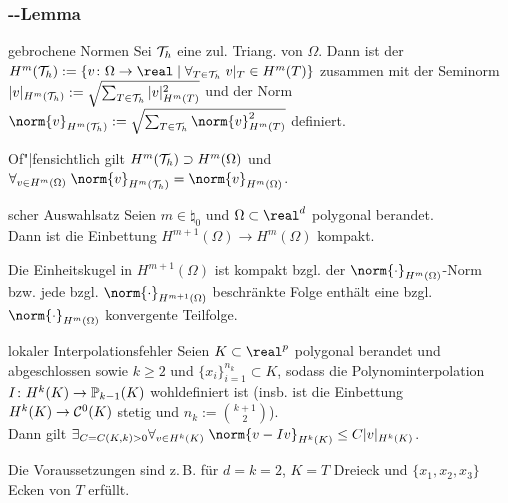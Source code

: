 \subsubsection{%
    --Lemma%
}

\begin{Def}{gebrochene Normen}
    Sei $\mathcal{T}_h$ eine zul. Triang. von $\Omega$.
    Dann ist der 
    $H^m(\T_h) := \{v\colon \Omega \to \real \;|\; \forall_{T \in \T_h}\; v|_T \in H^m(T)\}$
    zusammen mit der Seminorm\\
    $|v|_{H^m(\mathcal{T}_h)} := \sqrt{\sum_{T \in \mathcal{T}_h} |v|_{H^m(T)}^2}$
    und der Norm $\norm{v}_{H^m(\T_h)} := \sqrt{\sum_{T \in \T_h} \norm{v}_{H^m(T)}^2}$ definiert.
\end{Def}

\begin{Bem}
    Of"|fensichtlich gilt $H^m(\mathcal{T}_h) \supset H^m(\Omega)$ und
    $\forall_{v \in H^m(\Omega)}\; \norm{v}_{H^m(\T_h)} = \norm{v}_{H^m(\Omega)}$.
\end{Bem}

\begin{Satz}{scher Auswahlsatz}
    Seien $m \in \natural_0$ und $\Omega \subset \real^d$ polygonal berandet.\\
    Dann ist die Einbettung $H^{m+1}(\Omega) \to H^m(\Omega)$ kompakt.
\end{Satz}

\begin{Bem}
    Die Einheitskugel in $H^{m+1}(\Omega)$ ist kompakt bzgl. der
    $\norm{\cdot}_{H^m(\Omega)}$-Norm bzw.
    jede bzgl. $\norm{\cdot}_{H^{m+1}(\Omega)}$ beschränkte Folge enthält eine
    bzgl. $\norm{\cdot}_{H^m(\Omega)}$ konvergente Teilfolge.
\end{Bem}

\linie

\begin{Satz}{lokaler Interpolationsfehler}
    Seien $K \subset \real^p$ polygonal berandet und abgeschlossen
    sowie $k \ge 2$ und $\{x_i\}_{i=1}^{n_k} \subset K$, sodass
    die Polynominterpolation $I\colon H^k(K) \to \mathbb{P}_{k-1}(K)$ wohldefiniert ist
    (insb. ist die Einbettung $H^k(K) \to \mathcal{C}^0(K)$ stetig und $n_k := \binom{k+1}{2}$).\\
    Dann gilt $\exists_{C = C(K, k) > 0}
    \forall_{v \in H^k(K)}\; \norm{v - Iv}_{H^k(K)} \le C |v|_{H^k(K)}$.
\end{Satz}

\begin{Bem}
    Die Voraussetzungen sind z.\,B. für $d = k = 2$, $K = T$ Dreieck
    und $\{x_1, x_2, x_3\}$ Ecken von $T$ erfüllt.
\end{Bem}

